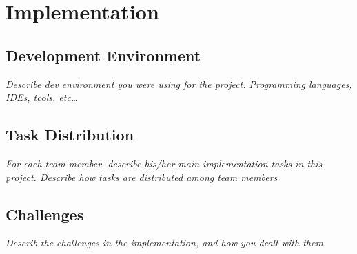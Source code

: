 
\section{Implementation}\label{sec:implementation}
    \subsection{Development Environment}
        \emph{Describe dev environment you were using for the project. Programming languages, IDEs, tools, etc\dots}

    \subsection{Task Distribution}
        \emph{For each team member, describe his/her main implementation tasks in this project. Describe how tasks are distributed among team members}

    \subsection{Challenges}
        \emph{Describ the challenges in the implementation, and how you dealt with them}

